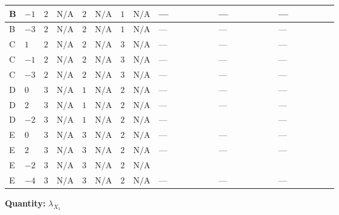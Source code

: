 \documentclass[8pt]{article}
\begin{document}
\begin{landscape}
\begin{longtable}{@{}llcccccc >{\raggedright\arraybackslash}p{0.21\linewidth} >{\raggedright\arraybackslash}p{0.21\linewidth} >{\raggedright\arraybackslash}p{0.21\linewidth}@{}}
\midrule
B & $-1$ & $2$ & $\text{N/A}$ & $2$ & $\text{N/A}$ & $1$ & $\text{N/A}$ & --- & --- & --- \\
\midrule
B & $-3$ & $2$ & $\text{N/A}$ & $2$ & $\text{N/A}$ & $1$ & $\text{N/A}$ & --- & --- & --- \\
\midrule
C & $1$ & $2$ & $\text{N/A}$ & $2$ & $\text{N/A}$ & $3$ & $\text{N/A}$ & --- & --- & --- \\
\midrule
C & $-1$ & $2$ & $\text{N/A}$ & $2$ & $\text{N/A}$ & $3$ & $\text{N/A}$ & --- & --- & --- \\
\midrule
C & $-3$ & $2$ & $\text{N/A}$ & $2$ & $\text{N/A}$ & $3$ & $\text{N/A}$ & --- & --- & --- \\
\midrule
D & $0$ & $3$ & $\text{N/A}$ & $1$ & $\text{N/A}$ & $2$ & $\text{N/A}$ & --- & --- & --- \\
\midrule
D & $2$ & $3$ & $\text{N/A}$ & $1$ & $\text{N/A}$ & $2$ & $\text{N/A}$ & --- & --- & --- \\
\midrule
D & $-2$ & $3$ & $\text{N/A}$ & $1$ & $\text{N/A}$ & $2$ & $\text{N/A}$ & --- & \scriptsize\adjustbox{max width=\linewidth}{$\begin{gathered} 12 {\lambda_{S_2}^{(1)}} {\lambda_{X_{1}}}\end{gathered}$} & --- \\
\midrule
E & $0$ & $3$ & $\text{N/A}$ & $3$ & $\text{N/A}$ & $2$ & $\text{N/A}$ & --- & --- & --- \\
\midrule
E & $2$ & $3$ & $\text{N/A}$ & $3$ & $\text{N/A}$ & $2$ & $\text{N/A}$ & --- & --- & --- \\
\midrule
E & $-2$ & $3$ & $\text{N/A}$ & $3$ & $\text{N/A}$ & $2$ & $\text{N/A}$ & \scriptsize\adjustbox{max width=\linewidth}{$\begin{gathered} -24 {g_2}^2 {\lambda_{X_{1}}}\end{gathered}$} & \scriptsize\adjustbox{max width=\linewidth}{$\begin{gathered} +12 {\lambda_{S_2}^{(1)}} {\lambda_{X_{1}}}\end{gathered}$} & \scriptsize\adjustbox{max width=\linewidth}{$\begin{gathered} -8 {\lambda_{S_2}^{(A)}} {\lambda_{X_{1}}}\end{gathered}$} \\
\midrule
E & $-4$ & $3$ & $\text{N/A}$ & $3$ & $\text{N/A}$ & $2$ & $\text{N/A}$ & --- & --- & --- \\
\midrule
\bottomrule
\end{longtable}
\clearpage
\noindent\textbf{Quantity: }${\lambda_{X_{1}}}$\par\smallskip

\end{landscape}
\end{document}
